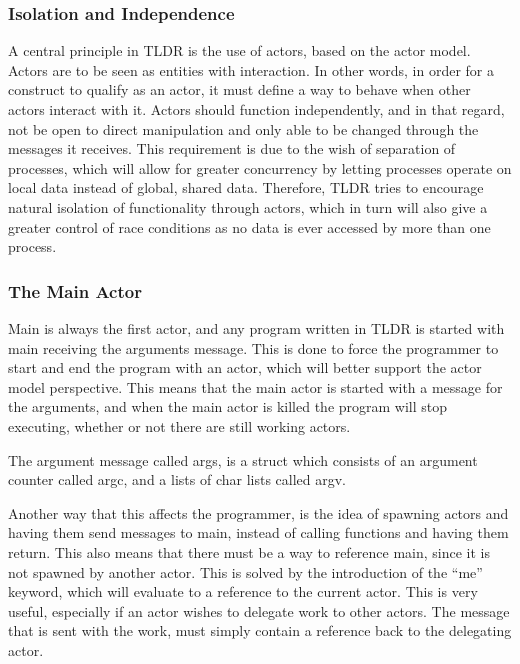 \subsubsection{Isolation and Independence}

A central principle in TLDR is the use of actors, based on the actor model. Actors are to be seen as entities with interaction. In other words, in order for a construct to qualify as an actor, it must define a way to behave when other actors interact with it. Actors should function independently, and in that regard, not be open to direct manipulation and only able to be changed through the messages it receives. This requirement is due to the wish of separation of processes, which will allow for greater concurrency by letting processes operate on local data instead of global, shared data. Therefore, TLDR tries to encourage natural isolation of functionality through actors, which in turn will also give a greater control of race conditions as no data is ever accessed by more than one process.

\subsubsection{The Main Actor}

Main is always the first actor, and any program written in TLDR is started with main receiving the arguments message. This is done to force the programmer to start and end the program with an actor, which will better support the actor model perspective. This means that the main actor is started with a message for the arguments, and when the main actor is killed the program will stop executing, whether or not there are still working actors.

The argument message called args, is a struct which consists of an argument counter called argc, and a lists of char lists called argv.

Another way that this affects the programmer, is the idea of spawning actors and having them send messages to main, instead of calling functions and having them return. This also means that there must be a way to reference main, since it is not spawned by another actor. This is solved by the introduction of the \enquote{me} keyword, which will evaluate to a reference to the current actor. This is very useful, especially if an actor wishes to delegate work to other actors. The message that is sent with the work, must simply contain a reference back to the delegating actor.

